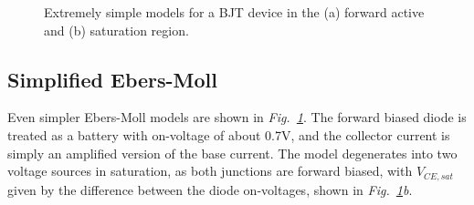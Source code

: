 \begin{figure}[t]
\centering
{}
\caption{Extremely simple models for a BJT device in the (a) forward active and (b) saturation region.} \label{fig:slide19}
\end{figure} 
\subsection{Simplified Ebers-Moll}
Even simpler Ebers-Moll models are shown in \emph{Fig.~\ref{fig:slide19}}. The forward biased diode is treated as a battery with on-voltage of about 0.7V, and the collector current is simply an amplified version of the base current.  The model degenerates into two voltage sources in saturation, as both junctions are forward biased, with $V_{CE,sat}$ given by the difference between the diode on-voltages, shown in \emph{Fig.~\ref{fig:slide19}b}.
